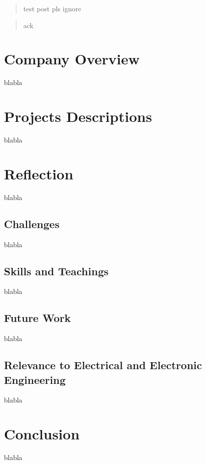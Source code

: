 \documentclass[12pt]{article}
\begin{document}
\renewcommand{\abstractname}{Abstract}
\begin{abstract}
test post pls ignore
\end{abstract}

\newpage

\renewcommand{\abstractname}{Acknowledgements}
\begin{abstract}
ack
\end{abstract}

\newpage
\tableofcontents
\newpage

\section{Company Overview}
blabla

\newpage
\section{Projects Descriptions}
blabla

\newpage
\section{Reflection}
blabla

\subsection{Challenges}
blabla

\subsection{Skills and Teachings}
blabla

\subsection{Future Work}
blabla

\subsection{Relevance to Electrical and Electronic Engineering}
blabla

\newpage
\section{Conclusion}
blabla
\end{document}
